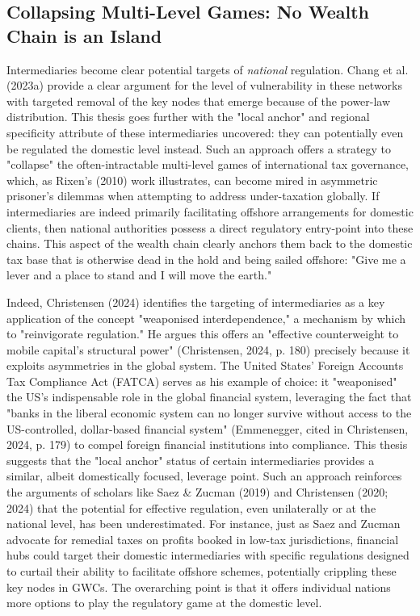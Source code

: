 \subsection{Collapsing Multi-Level Games: No Wealth Chain is an Island}
\label{subsec:collapsing_games_chokepoints}

Intermediaries become clear potential targets of \textit{national} regulation. Chang et al. (2023a) provide a clear argument for the level of vulnerability in these networks with targeted removal of the key nodes that emerge because of the power-law distribution. This thesis goes further with the "local anchor" and regional specificity attribute of these intermediaries uncovered: they can potentially even be regulated the domestic level instead. Such an approach offers a strategy to "collapse" the often-intractable multi-level games of international tax governance, which, as Rixen's (2010) work illustrates, can become mired in asymmetric prisoner's dilemmas when attempting to address under-taxation globally. If intermediaries are indeed primarily facilitating offshore arrangements for domestic clients, then national authorities possess a direct regulatory entry-point into these chains. This aspect of the wealth chain clearly anchors them back to the domestic tax base that is otherwise dead in the hold and being sailed offshore: "Give me a lever and a place to stand and I will move the earth."

Indeed, Christensen (2024) identifies the targeting of intermediaries as a key application of the concept "weaponised interdependence," a mechanism by which to "reinvigorate regulation." He argues this offers an "effective counterweight to mobile capital's structural power" (Christensen, 2024, p. 180) precisely because it exploits asymmetries in the global system. The United States' Foreign Accounts Tax Compliance Act (FATCA) serves as his example of choice: it "weaponised" the US's indispensable role in the global financial system, leveraging the fact that "banks in the liberal economic system can no longer survive without access to the US-controlled, dollar-based financial system" (Emmenegger, cited in Christensen, 2024, p. 179) to compel foreign financial institutions into compliance. This thesis suggests that the "local anchor" status of certain intermediaries provides a similar, albeit domestically focused, leverage point. Such an approach reinforces the arguments of scholars like Saez \& Zucman (2019) and Christensen (2020; 2024) that the potential for effective regulation, even unilaterally or at the national level, has been underestimated. For instance, just as Saez and Zucman advocate for remedial taxes on profits booked in low-tax jurisdictions, financial hubs could target their domestic intermediaries with specific regulations designed to curtail their ability to facilitate offshore schemes, potentially crippling these key nodes in GWCs. The overarching point is that it offers individual nations more options to play the regulatory game at the domestic level.


